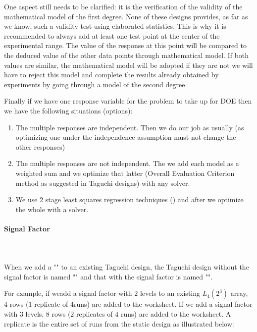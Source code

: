 	One aspect still needs to be clarified: it is the verification of the validity of the mathematical model of the first degree. None of these designs provides, as far as we know, such a validity test using elaborated statistics. This is why it is recommended to always add at least one test point at the center of the experimental range. The value of the response at this point will be compared to the deduced value of the other data points through mathematical model. If both values are similar, the mathematical model will be adopted if they are not we will have to reject this model and complete the results already obtained by experiments by going through a model of the second degree.

	
	Finally if we have one response variable for the problem to take up for DOE then we have the following situations (options):
	\begin{enumerate}
		\item The multiple responses are independent. Then we do our job as usually (as optimizing one under the independence assumption must not change the other responses)

		\item The multiple responses are not independent. The we add each model as a weighted sum and we optimize that latter (Overall Evaluation Criterion method as suggested in Taguchi designs) with any solver.

		\item We use $2$ stage least squares regression techniques () and after we optimize the whole with a solver.				
	\end{enumerate}
	
	\paragraph{Signal Factor}\mbox{}\\\\
	When we add a "" to an existing Taguchi design, the Taguchi design without the signal factor is named "" and that with the signal factor is named "".
	
	For example, if weadd a signal factor with $2$ levels to an existing $L_4(2^3)$ array, $4$ rows ($1$ replicate of $4 $runs) are added to the worksheet. If we add a signal factor with $3$ levels, $8$ rows ($2$ replicates of $4$ runs) are added to the worksheet. A replicate is the entire set of runs from the static design as illustrated below:
	
